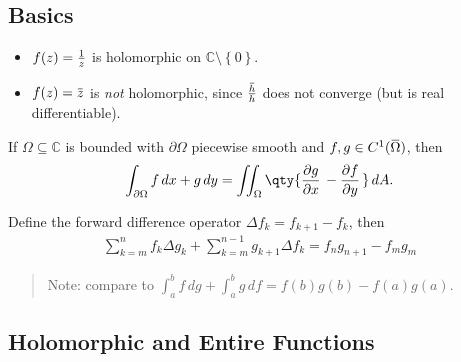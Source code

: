 \hypertarget{basics}{%
\subsection{Basics}\label{basics}}

\begin{example}

\envlist

\begin{itemize}
\tightlist
\item
  \(f(z) = {1\over z}\) is holomorphic on
  \({\mathbb{C}}\setminus\left\{{0}\right\}\).
\item
  \(f(z) = \mkern 1.5mu\overline{\mkern-1.5muz\mkern-1.5mu}\mkern 1.5mu\)
  is \emph{not} holomorphic, since
  \(\mkern 1.5mu\overline{\mkern-1.5muh\mkern-1.5mu}\mkern 1.5mu \over h\)
  does not converge (but is real differentiable).
\end{itemize}

\end{example}

\begin{theorem}

If \(\Omega \subseteq {\mathbb{C}}\) is bounded with
\({{\partial}}\Omega\) piecewise smooth and
\(f, g\in C^1(\mkern 1.5mu\overline{\mkern-1.5mu\Omega\mkern-1.5mu}\mkern 1.5mu)\),
then
\begin{align*}\int_{{{\partial}}\Omega} f\, dx + g\, dy = \iint_{\Omega} \qty{ {\frac{\partial g}{\partial x}\,} - {\frac{\partial f}{\partial y}\,} } \, dA.\end{align*}

\end{theorem}

\begin{theorem}

Define the forward difference operator \(\Delta f_k = f_{k+1} - f_k\),
then
\begin{align*}
\sum_{k=m}^n f_k \Delta g_k  + \sum_{k=m}^{n-1} g_{k+1}\Delta f_k = f_n g_{n+1} - f_m g_m
\end{align*}

\begin{quote}
Note: compare to
\(\int_a^b f \, dg + \int_a^b g\, df = f(b) g(b) - f(a) g(a)\).
\end{quote}

\end{theorem}

\hypertarget{holomorphic-and-entire-functions}{%
\subsection{Holomorphic and Entire
Functions}\label{holomorphic-and-entire-functions}}

